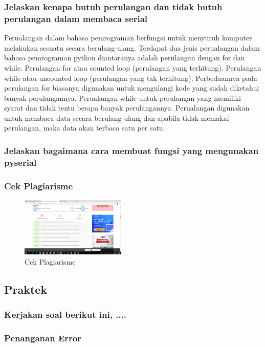 \subsubsection{Jelaskan kenapa butuh perulangan dan tidak butuh perulangan dalam membaca serial}
Perualangan dalam bahasa pemrograman berfungsi untuk menyuruh komputer melakukan sesuatu secara berulang-ulang. Terdapat dua jenis perualangan dalam bahasa pemrograman python diantaranya adalah perulangan dengan for dan while.
Perulangan for atau counted loop (perulangan yang terhitung). Perulangan while atau uncounted loop (perulangan yang tak terhitung). Perbedaannya pada perulangan for biasanya digunakan untuk mengulangi kode yang sudah diketahui banyak perulangannya. Perualangan while untuk perulangan yang memiliki syarat dan tidak tentu berapa banyak perulangannya.
Perualangan digunakan untuk membaca data secara berulang-ulang  dan apabila tidak memakai perulangan, maka data akan terbaca satu per satu.

\subsubsection{Jelaskan bagaimana cara membuat fungsi yang mengunakan pyserial}


\subsubsection{Cek Plagiarisme}
\begin{figure}[H]	
    \includegraphics[width=5cm]{figures/5/1174008/teori/ssplagiatchapter5.png}
    \centering
    \caption{Cek Plagiarisme}
\end{figure}

\subsection{Praktek}
\subsubsection{Kerjakan soal berikut ini, ....}
\subsubsection{Penanganan Error}